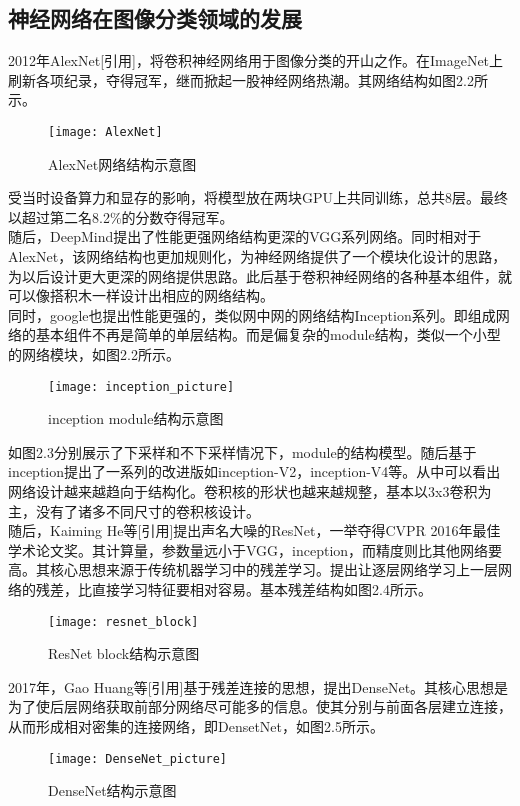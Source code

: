 \subsection{神经网络在图像分类领域的发展}
2012年AlexNet[引用]，将卷积神经网络用于图像分类的开山之作。在ImageNet上刷新各项纪录，夺得冠军，继而掀起一股神经网络热潮。其网络结构如图2.2所示。\\
\begin{figure}[htp]
\centering
\texttt{[image: AlexNet]}
\caption{AlexNet网络结构示意图}
\end{figure}
受当时设备算力和显存的影响，将模型放在两块GPU上共同训练，总共8层。最终以超过第二名8.2\%的分数夺得冠军。\\
随后，DeepMind提出了性能更强网络结构更深的VGG系列网络。同时相对于AlexNet，该网络结构也更加规则化，为神经网络提供了一个模块化设计的思路，为以后设计更大更深的网络提供思路。此后基于卷积神经网络的各种基本组件，就可以像搭积木一样设计出相应的网络结构。\\
同时，google也提出性能更强的，类似网中网的网络结构Inception系列。即组成网络的基本组件不再是简单的单层结构。而是偏复杂的module结构，类似一个小型的网络模块，如图2.2所示。\\
\begin{figure}[htp]
\centering
\texttt{[image: inception\_picture]}
\caption{inception module结构示意图}
\end{figure}
如图2.3分别展示了下采样和不下采样情况下，module的结构模型。随后基于inception提出了一系列的改进版如inception-V2，inception-V4等。从中可以看出网络设计越来越趋向于结构化。卷积核的形状也越来越规整，基本以3x3卷积为主，没有了诸多不同尺寸的卷积核设计。\\
随后，Kaiming He等[引用]提出声名大噪的ResNet，一举夺得CVPR 2016年最佳学术论文奖。其计算量，参数量远小于VGG，inception，而精度则比其他网络要高。其核心思想来源于传统机器学习中的残差学习。提出让逐层网络学习上一层网络的残差，比直接学习特征要相对容易。基本残差结构如图2.4所示。
\begin{figure}[htp]
\centering
\texttt{[image: resnet\_block]}
\caption{ResNet block结构示意图}
\end{figure}
2017年，Gao Huang等[引用]基于残差连接的思想，提出DenseNet。其核心思想是为了使后层网络获取前部分网络尽可能多的信息。使其分别与前面各层建立连接，从而形成相对密集的连接网络，即DensetNet，如图2.5所示。\\
\begin{figure}[htp]
\centering
\texttt{[image: DenseNet\_picture]}
\caption{DenseNet结构示意图}
\end{figure}
